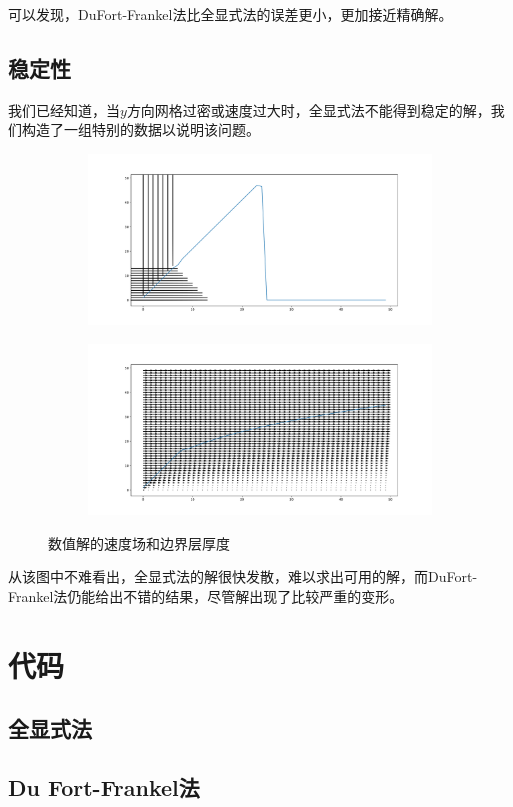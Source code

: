 \documentclass[12pt]{ctexart}
\begin{document}
可以发现，DuFort-Frankel法比全显式法的误差更小，更加接近精确解。

\subsection{稳定性}

我们已经知道，当$y$方向网格过密或速度过大时，全显式法不能得到稳定的解，我们构造了一组特别的数据以说明该问题。
\begin{figure}[ht]
    \centering
    \begin{subfigure}{0.4\textwidth}
        \includegraphics[width=\textwidth]{figure/explict_unstable.pdf}
    \end{subfigure}
    \begin{subfigure}{0.4\textwidth}
        \includegraphics[width=\textwidth]{figure/dufort_stable.pdf}
    \end{subfigure}
    \caption{数值解的速度场和边界层厚度}
\end{figure}
从该图中不难看出，全显式法的解很快发散，难以求出可用的解，而DuFort-Frankel法仍能给出不错的结果，尽管解出现了比较严重的变形。

\clearpage
\appendix
\section{代码}

\subsection{全显式法}


\subsection{Du Fort-Frankel法}


\clearpage
\printbibliography
\end{document}
